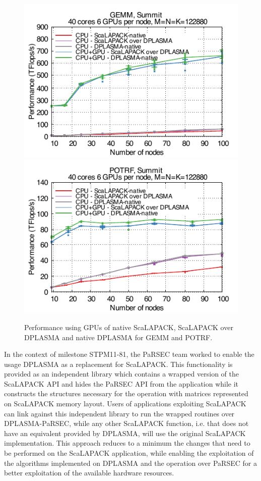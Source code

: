 \begin{figure}
\centering\includegraphics[width=.9\linewidth]{projects/2.3.1-PMR/2.3.1.09-ParSEC/scalapack_GEMM.pdf}
\centering\includegraphics[width=.9\linewidth]{projects/2.3.1-PMR/2.3.1.09-ParSEC/scalapack_POTRF.pdf}
\caption{Performance using GPUs of native ScaLAPACK, ScaLAPACK over
  DPLASMA and native DPLASMA for GEMM and
  POTRF.\label{fig:scalapack_gpu}}
\end{figure}
In the context of milestone STPM11-81, the PaRSEC team worked to
enable the usage DPLASMA as a replacement for ScaLAPACK.  This
functionality is provided as an independent library which contains a
wrapped version of the ScaLAPACK API and hides the PaRSEC API from the
application while it constructs the structures necessary for the
operation with matrices represented on ScaLAPACK memory layout.  Users
of applications exploiting ScaLAPACK can link against this independent
library to run the wrapped routines over DPLASMA-PaRSEC, while any
other ScaLAPACK function, i.e. that does not have an equivalent
provided by DPLASMA, will use the original ScaLAPACK implementation.
This approach reduces to a minimum the changes that need to be
performed on the ScaLAPACK application, while enabling the
exploitation of the algorithms implemented on DPLASMA and the
operation over PaRSEC for a better exploitation of the available
hardware resources.


